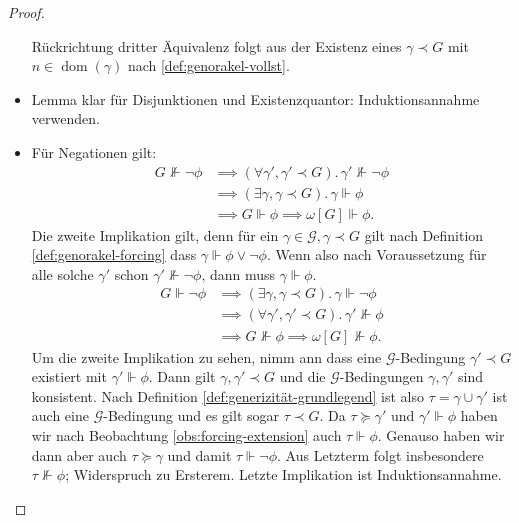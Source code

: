 \documentclass[nofonts]{uebung}
\theoremstyle{definition}
\DeclareMathOperator{\dom}{dom}
\begin{document}
\begin{proof}
\begin{itemize}
            Rückrichtung dritter Äquivalenz folgt aus der Existenz eines $\gamma\prec G$ mit $n\in\dom(\gamma)$ nach \ref{def:genorakel-vollst}.
        \item Lemma klar für Disjunktionen und Existenzquantor: Induktionsannahme verwenden.
        \item Für Negationen gilt: 
            \begin{align*}
                G\not\Vdash \neg\phi &\implies (\forall \gamma', \gamma'\prec G).\,\gamma'\not\Vdash \neg\phi\\
                                     &\implies (\exists \gamma, \gamma\prec G).\,\gamma\Vdash \phi\\
                                     &\implies G\Vdash\phi \implies \omega[G]\Vdash \phi.
            \end{align*}
            Die zweite Implikation gilt, denn für ein $\gamma\in \mathcal G, \gamma\prec G$ gilt nach Definition \ref{def:genorakel-forcing} dass $\gamma\Vdash \phi\lor \neg \phi$.
            Wenn also nach Voraussetzung für alle solche $\gamma'$ schon $\gamma'\not\Vdash \neg\phi$, dann muss $\gamma\Vdash \phi$.
            \begin{align*}
                G\Vdash \neg\phi &\implies (\exists \gamma, \gamma\prec G).\,\gamma\Vdash \neg\phi\\
                                     &\implies (\forall \gamma', \gamma'\prec G).\,\gamma'\not\Vdash \phi\\
                                     &\implies G\not\Vdash\phi \implies \omega[G]\not\Vdash \phi.
            \end{align*}
            Um die zweite Implikation zu sehen, nimm ann dass eine $\mathcal G$-Bedingung $\gamma'\prec G$ existiert mit $\gamma'\Vdash\phi$.
            Dann gilt $\gamma, \gamma'\prec G$ und die $\mathcal G$-Bedingungen $\gamma, \gamma'$ sind konsistent.
            Nach Definition \ref{def:generizität-grundlegend} ist also $\tau=\gamma\cup \gamma'$ ist auch eine $\mathcal G$-Bedingung und es gilt sogar $\tau\prec G$.
            Da $\tau\succeq\gamma'$ und $\gamma'\Vdash\phi$ haben wir nach Beobachtung \ref{obs:forcing-extension} auch $\tau\Vdash\phi$.
            Genauso haben wir dann aber auch $\tau\succeq\gamma$ und damit $\tau\Vdash \neg\phi$. Aus Letzterm folgt insbesondere $\tau\not\Vdash\phi$; Widerspruch zu Ersterem. Letzte Implikation ist Induktionsannahme. \qedhere
    \end{itemize}
\end{proof}
\end{document}
